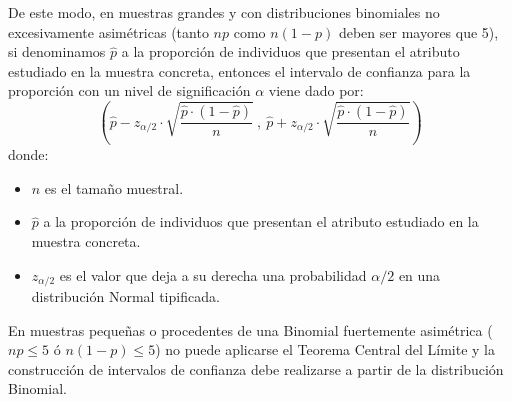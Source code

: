 De este modo, en muestras grandes y con distribuciones binomiales no excesivamente asimétricas (tanto $np$ como $n(1-p)$
deben ser mayores que 5), si denominamos $\widehat{p}$ a la proporción de individuos que presentan el atributo estudiado
en la muestra concreta, entonces el intervalo de confianza para la proporción con un nivel de significación $\alpha$
viene dado por:
\[
\left( \widehat{p}-z_{\alpha /2}\cdot \sqrt{\dfrac{\widehat{p}\cdot (1-%
\widehat{p})}{n}}\ ,\ \widehat{p}+z_{\alpha /2}\cdot \sqrt{\dfrac{\widehat{p}%
\cdot (1-\widehat{p})}{n}}\right)
\]
donde:
\begin{itemize}[label=--]
\item $n$ es el tamaño muestral.
\item $\widehat{p}$ a la proporción de individuos que presentan el atributo estudiado en la muestra concreta.
\item $z_{\alpha /2}$ es el valor que deja a su derecha una probabilidad $\alpha /2 $ en una distribución Normal
tipificada.
\end{itemize}

En muestras pequeñas o procedentes de una Binomial fuertemente asimétrica ($np \leq 5$ ó $n(1-p)\leq 5$) no puede
aplicarse el Teorema Central del Límite y la construcción de intervalos de confianza debe realizarse a partir de la
distribución Binomial.

\clearpage
\newpage

